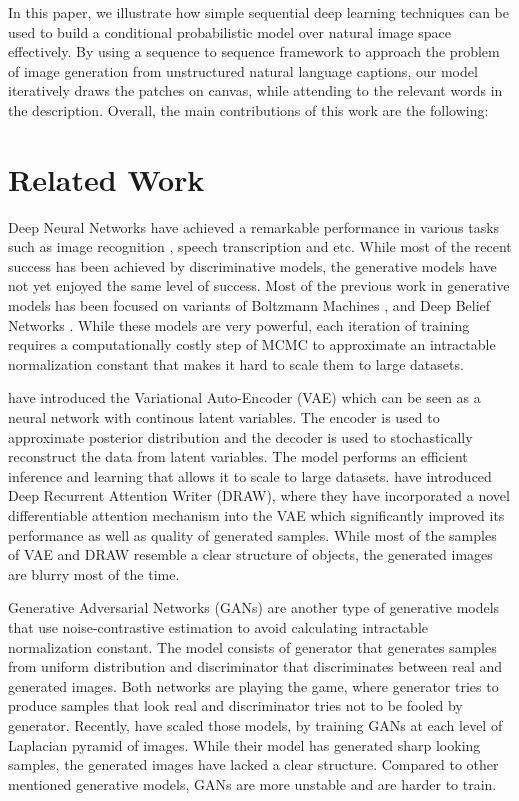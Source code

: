 \documentclass{article} %
\begin{document}
In this paper, we illustrate how simple sequential deep learning techniques can be used to build a conditional probabilistic model over natural image space effectively. By using a sequence to sequence framework to approach the problem of image generation from unstructured natural language captions, our model iteratively draws the patches on canvas, while attending to the relevant words in the description. Overall, the main contributions of this work are the following:


\section{Related Work}

Deep Neural Networks have achieved a remarkable performance in various tasks such as image recognition \citep{krizhevsky_imagenet}, speech transcription \citep{graves_speech} and etc. While most of the recent success has been achieved by discriminative models, the generative models have not yet enjoyed the same level of success. Most of the previous work in generative models has been focused on variants of Boltzmann Machines \citep{smolensky_rbm}, \citep{russ_dbm} and Deep Belief Networks \citep{hinton_dbn}. While these models are very powerful, each iteration of training requires a computationally costly step of MCMC to approximate an intractable normalization constant that makes it hard to scale them to large datasets.

\cite{kingma_vae} have introduced the Variational Auto-Encoder (VAE) which can be seen as a neural network with continous latent variables. The encoder is used to approximate posterior distribution and the decoder is used to stochastically reconstruct the data from latent variables. The model performs an efficient inference and learning that allows it to scale to large datasets. \cite{gregor_draw} have introduced Deep Recurrent Attention Writer (DRAW), where they have incorporated a novel differentiable attention mechanism into the VAE which significantly improved its performance as well as quality of generated samples. While most of the samples of VAE and DRAW resemble a clear structure of objects, the generated images are blurry most of the time.

Generative Adversarial Networks (GANs) \citep{goodfellow_gan} are another type of generative models that use noise-contrastive estimation \citep{gutmann_nce} to avoid calculating intractable normalization constant. The model consists of generator that generates samples from uniform distribution and discriminator that discriminates between real and generated images. Both networks are playing the game, where generator tries to produce samples that look real and discriminator tries not to be fooled by generator. Recently, \cite{denton_lapgan} have scaled those models, by training GANs at each level of Laplacian pyramid of images. While their model has generated sharp looking samples, the generated images have lacked a clear structure. Compared to other mentioned generative models, GANs are more unstable and are harder to train.
\end{document}
